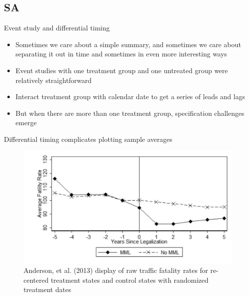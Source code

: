 \documentclass{beamer}
\begin{document}
\subsection{SA}

\begin{frame}{Event study and differential timing}

\begin{itemize}
\item Sometimes we care about a simple summary, and sometimes we care about separating it out in time and sometimes in even more interesting ways
\item Event studies with one treatment group and one untreated group were relatively straightforward
\item Interact treatment group with calendar date to get a series of leads and lags
\item But when there are more than one treatment group, specification challenges emerge
\end{itemize}

\end{frame}



\begin{frame}{Differential timing complicates plotting sample averages}

	\begin{figure}
	\includegraphics[scale=0.25]{./lecture_includes/mml_eventstudy.png}
	\caption{Anderson, et al. (2013) display of raw traffic fatality rates for re-centered treatment states and control states with randomized treatment dates}
	\end{figure}

\end{frame}
\end{document}

